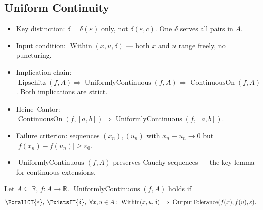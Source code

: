 
\subsection{Uniform Continuity}
\label{sec:uniform-continuity}

\begin{tcolorbox}[title={Toolkit --- Uniform Continuity}]
\begin{itemize}
  \item Key distinction: $\delta=\delta(\varepsilon)$ only, not
    $\delta(\varepsilon,c)$. One $\delta$ serves all pairs in $A$.
  \item Input condition: $\operatorname{Within}(x,u,\delta)$ — both
    $x$ and $u$ range freely, no puncturing.
  \item Implication chain: $\operatorname{Lipschitz}(f,A)
    \Rightarrow\operatorname{UniformlyContinuous}(f,A)
    \Rightarrow\operatorname{ContinuousOn}(f,A)$.
    Both implications are strict.
  \item Heine--Cantor: $\operatorname{ContinuousOn}(f,[a,b])
    \Rightarrow\operatorname{UniformlyContinuous}(f,[a,b])$.
  \item Failure criterion: sequences $(x_n),(u_n)$ with
    $x_n-u_n\to 0$ but $|f(x_n)-f(u_n)|\geq\varepsilon_0$.
  \item $\operatorname{UniformlyContinuous}(f,A)$ preserves Cauchy
    sequences — the key lemma for continuous extensions.
\end{itemize}
\end{tcolorbox}


\begin{tcolorbox}[title={Definition --- Uniform Continuity}]
\begin{definition}
\label{def:uniform-continuity}
Let $A\subseteq\mathbb{R}$, $f:A\to\mathbb{R}$.
$\operatorname{UniformlyContinuous}(f,A)$ holds if
\[
  \ForallOT{\varepsilon},\;
  \ExistsIT{\delta},\;
  \forall x,u\in A:\;
  \operatorname{Within}(x,u,\delta)
  \;\Rightarrow\;
  \operatorname{OutputTolerance}(f(x),f(u),\varepsilon).
\]
\end{definition}
\end{tcolorbox}

